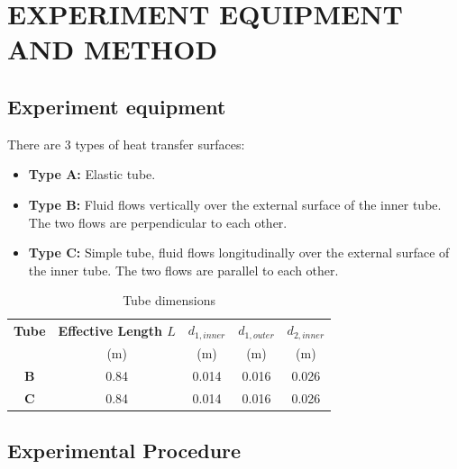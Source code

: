 \section{EXPERIMENT EQUIPMENT AND METHOD}\label{experiment-equipment-and-method}

\subsection{Experiment equipment}\label{experiment-equipment}

There are 3 types of heat transfer surfaces:
\begin{itemize}
    \item \textbf{Type A:} Elastic tube.
    \item \textbf{Type B:} Fluid flows vertically over the external surface of the inner tube. The two flows are perpendicular to each other.
    \item \textbf{Type C:} Simple tube, fluid flows longitudinally over the external surface of the inner tube. The two flows are parallel to each other.
\end{itemize}

\begin{table}[H]
    \centering
    \caption{Tube dimensions}
    \label{tab:tube-dimensions}
    \begin{tabular}{|c|c|c|c|c|}
        \hline
        \textbf{Tube} & \textbf{Effective Length $L$} & \textbf{$d_{1,inner}$} & \textbf{$d_{1,outer}$} & \textbf{$d_{2,inner}$} \\
                      & (m)                          & (m)                    & (m)                    & (m)                    \\ \hline
        \textbf{B}    & 0.84                         & 0.014                  & 0.016                  & 0.026                  \\ \hline
        \textbf{C}    & 0.84                         & 0.014                  & 0.016                  & 0.026                  \\ \hline
    \end{tabular}
\end{table}

\subsection{Experimental Procedure}\label{method}

